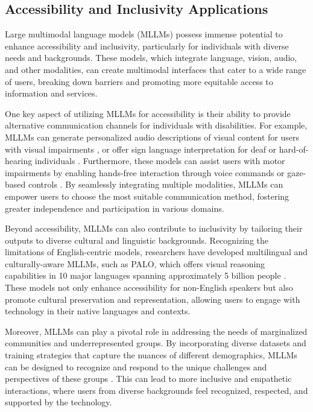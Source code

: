 \documentclass[11pt]{article}
\begin{document}
\subsection{Accessibility and Inclusivity Applications}

Large multimodal language models (MLLMs) possess immense potential to enhance accessibility and inclusivity, particularly for individuals with diverse needs and backgrounds. These models, which integrate language, vision, audio, and other modalities, can create multimodal interfaces that cater to a wide range of users, breaking down barriers and promoting more equitable access to information and services.

One key aspect of utilizing MLLMs for accessibility is their ability to provide alternative communication channels for individuals with disabilities. For example, MLLMs can generate personalized audio descriptions of visual content for users with visual impairments \cite{ref17}, or offer sign language interpretation for deaf or hard-of-hearing individuals \cite{ref221}. Furthermore, these models can assist users with motor impairments by enabling hands-free interaction through voice commands or gaze-based controls \cite{ref222}. By seamlessly integrating multiple modalities, MLLMs can empower users to choose the most suitable communication method, fostering greater independence and participation in various domains.

Beyond accessibility, MLLMs can also contribute to inclusivity by tailoring their outputs to diverse cultural and linguistic backgrounds. Recognizing the limitations of English-centric models, researchers have developed multilingual and culturally-aware MLLMs, such as PALO, which offers visual reasoning capabilities in 10 major languages spanning approximately 5 billion people \cite{ref223}. These models not only enhance accessibility for non-English speakers but also promote cultural preservation and representation, allowing users to engage with technology in their native languages and contexts.

Moreover, MLLMs can play a pivotal role in addressing the needs of marginalized communities and underrepresented groups. By incorporating diverse datasets and training strategies that capture the nuances of different demographics, MLLMs can be designed to recognize and respond to the unique challenges and perspectives of these groups \cite{ref224}. This can lead to more inclusive and empathetic interactions, where users from diverse backgrounds feel recognized, respected, and supported by the technology.
\end{document}

